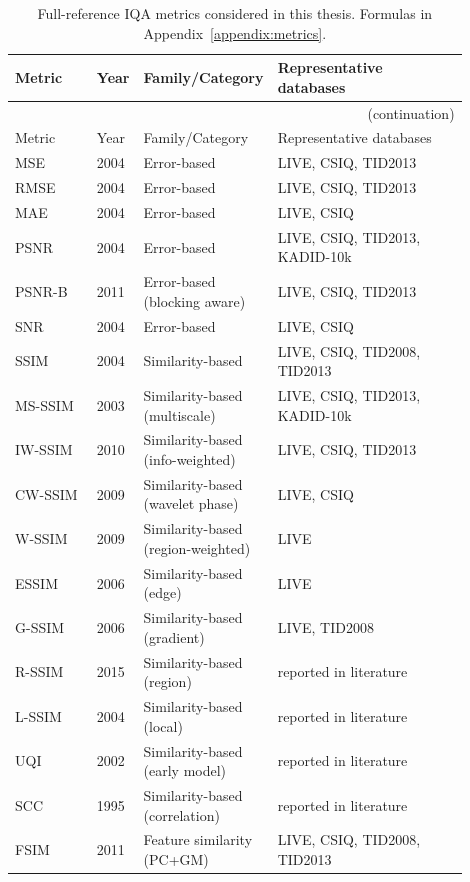 \begin{longtable}{
p{0.18\linewidth}  %
p{0.07\linewidth}  %
p{0.23\linewidth}  %
p{0.42\linewidth}  %
}
\caption{Full-reference IQA metrics considered in this thesis. Formulas in Appendix~\ref{appendix:metrics}.}\label{tab:fr_iqa_metrics_compact}\\
\hline
Metric & Year & Family/Category & Representative databases \\
\hline
\endfirsthead
\multicolumn{4}{r}{(continuation)}\\
\hline
Metric & Year & Family/Category & Representative databases \\
\hline
\endhead
\hline
\endfoot

MSE & 2004 & Error-based & LIVE, CSIQ, TID2013 \\
RMSE & 2004 & Error-based & LIVE, CSIQ, TID2013 \\
MAE & 2004 & Error-based & LIVE, CSIQ \\
PSNR & 2004 & Error-based & LIVE, CSIQ, TID2013, KADID-10k \\
PSNR-B & 2011 & Error-based (blocking aware) & LIVE, CSIQ, TID2013 \\
SNR & 2004 & Error-based & LIVE, CSIQ \\
SSIM & 2004 & Similarity-based & LIVE, CSIQ, TID2008, TID2013 \\
MS-SSIM & 2003 & Similarity-based (multiscale) & LIVE, CSIQ, TID2013, KADID-10k \\
IW-SSIM & 2010 & Similarity-based (info-weighted) & LIVE, CSIQ, TID2013 \\
CW-SSIM & 2009 & Similarity-based (wavelet phase) & LIVE, CSIQ \\
W-SSIM & 2009 & Similarity-based (region-weighted) & LIVE \\
ESSIM & 2006 & Similarity-based (edge) & LIVE \\
G-SSIM & 2006 & Similarity-based (gradient) & LIVE, TID2008 \\
R-SSIM & 2015 & Similarity-based (region) & reported in literature \\
L-SSIM & 2004 & Similarity-based (local) & reported in literature \\
UQI & 2002 & Similarity-based (early model) & reported in literature \\
SCC & 1995 & Similarity-based (correlation) & reported in literature \\
FSIM & 2011 & Feature similarity (PC+GM) & LIVE, CSIQ, TID2008, TID2013 \\

\end{longtable}
